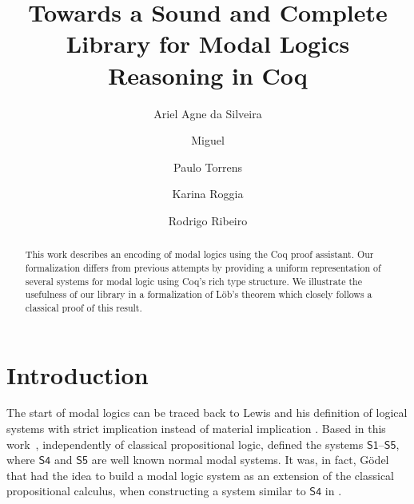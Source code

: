 \documentclass[sigconf]{acmart}
\begin{document}
\title{Towards a Sound and Complete Library for Modal Logics Reasoning in Coq}

\author{Ariel Agne da Silveira}
\author{Miguel}
\author{Paulo Torrens}
\author{Karina Roggia}
\author{Rodrigo Ribeiro}

\renewcommand{\shortauthors}{da Silveira et al.}

\begin{abstract}
  This work describes an encoding of modal logics using the Coq proof assistant.
  Our formalization differs from previous attempts by providing a uniform
  representation of several systems for modal logic using Coq's rich type
  structure. We illustrate the usefulness of our library in a formalization of
  L\"ob's theorem which closely follows a classical proof of this result.
\end{abstract}



\maketitle

\section{Introduction}\label{sec:intro}

The start of modal logics can be traced back to Lewis and his definition of 
logical systems with strict implication instead of material implication \cite{Lewis1918}.
Based in this work~\cite{Lewis1932}, independently of classical propositional logic,
defined the systems $\mathsf{S1}$--$\mathsf{S5}$, where $\mathsf{S4}$ and $\mathsf{S5}$
are well known normal modal systems. It was, in fact, G{\"o}del that had the idea 
to build a modal logic system as an extension of the classical propositional calculus, 
when constructing a system similar to $\mathsf{S4}$ in \cite{Godel1933}.
\end{document}
